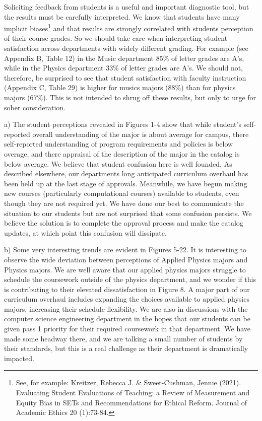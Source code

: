 \documentclass[12pt]{article}
\begin{document}
Soliciting feedback from students is a useful and important diagnostic tool, but the results must be carefully interpreted.  We know that students have many implicit biases\footnote{See, for example:  Kreitzer, Rebecca J. \& Sweet-Cushman, Jennie (2021). Evaluating Student Evaluations of Teaching: a Review of Measurement and Equity Bias in SETs and Recommendations for Ethical Reform. Journal of Academic Ethics 20 (1):73-84.} and that results are strongly correlated with students perception of their course grades.  So we should take care when interpreting student satisfaction across departments with widely different grading.  For example (see Appendix B, Table 12) in the Music department $85\%$ of letter grades are A's, while in the Physics department $33\%$ of letter grades are A's.  We should not, therefore, be surprised to see that student satisfaction with faculty instruction (Appendix C, Table 29) is higher for musics majors ($88\%$) than for physics majors ($67\%$).  This is not intended to shrug off these results, but only to urge for sober consideration.

a) The student perceptions revealed in Figures 1-4 show that while student's self-reported overall understanding of the major is about average for campus, there self-reported understanding of program requirements and policies is below overage, and there appraisal of the description of the major in the catalog is below average.  We believe that student confusion here is well founded.  As described elsewhere, our departments long anticipated curriculum overhaul has been held up at the last stage of approvals.  Meanwhile, we have begun making new courses (particularly computational courses) available to students, even though they are not required yet.  We have done our best to communicate the situation to our students but are not surprised that some confusion persists.  We believe the solution is to complete the approval process and make the catalog updates, at which point this confusion will dissipate.  

b) Some very interesting trends are evident in Figures 5-22.  It is interesting to observe the wide deviation between perceptions of Applied Physics majors and Physics majors.   We are well aware that our applied physics majors struggle to schedule the coursework outside of the physics department, and we wonder if this is contributing to their elevated dissatisfaction in Figure 8.  A major part of our curriculum overhaul includes expanding the choices available to applied physics majors, increasing their schedule flexibility.  We are also in discussions with the computer science engineering department in the hopes that our students can be given pass 1 priority for their required coursework in that department.  We have made some headway there, and we are talking a small number of students by their standards, but this is a real challenge as their department is dramatically impacted.
\end{document}
